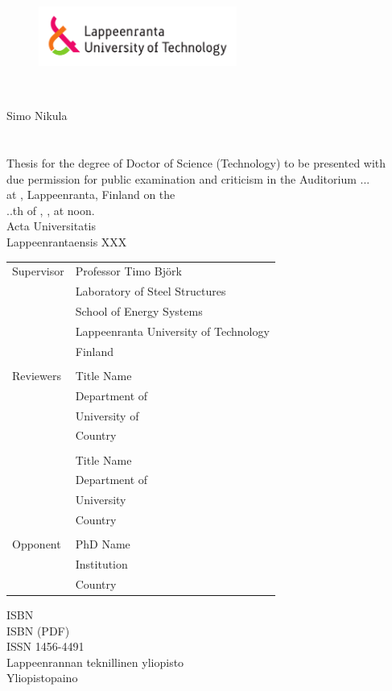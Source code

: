
\thispagestyle{empty} \setlength{\parindent}{0pt}
\begin{figure}
\includegraphics[width=65mm]{./figs/Merkki_Logo_CMYK}\\
\end{figure}
~\\

\vspace{60mm}

{\sffamily\large Simo Nikula\\
\\
\MakeUppercase{\Large \mytitle
}}\\

{\sffamily\footnotesize Thesis for the degree of Doctor of Science (Technology) to be presented with\\
due permission for public examination and criticism in the Auditorium ...\\
at \lut, Lappeenranta, Finland on the\\
..th of \mymonth, \myyear, at noon.}\\

{\sffamily\normalsize Acta Universitatis\\
Lappeenrantaensis XXX}

\pagebreak

\thispagestyle{empty}


\begin{tabular}{l p{11.0cm}}Supervisor& Professor Timo Björk\\
&Laboratory of Steel Structures\\
&School of Energy Systems\\
&Lappeenranta University of Technology\\
&Finland\\
\\
Reviewers& Title Name\\
&Department of \\
&University of \\
&Country\\
\\
& Title Name\\
&Department of \\
&University\\
&Country\\

\\
Opponent& PhD Name\\
&Institution\\
&Country\\
\end {tabular}



\begin{center}
ISBN \myisbn\\
ISBN \mypdfisbn (PDF)\\
ISSN 1456-4491\\
Lappeenrannan teknillinen yliopisto\\
Yliopistopaino \myyear

 \end{center}
\pagebreak
